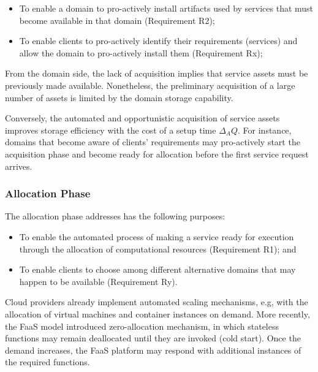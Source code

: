 \begin{itemize}

	\item To enable a domain to pro-actively install artifacts used by services that must become available in that domain (Requirement R2);
	
	\item To enable clients to pro-actively identify their requirements (services) and allow the domain to pro-actively install them (Requirement Rx);

\end{itemize}

From the domain side, the lack of acquisition implies that service assets must be previously made available. Nonetheless, the preliminary acquisition of a large number of assets is limited by the domain storage capability. 

Conversely, the automated and opportunistic acquisition of service assets improves storage efficiency with the cost of a setup time $\Delta_AQ$. For instance, domains that become aware of clients' requirements may pro-actively start the acquisition phase and become ready for allocation before the first service request arrives.


\subsubsection{Allocation Phase}\label{sec:A3-E-allocation}

The allocation phase addresses has the following purposes:

\begin{itemize}

\item To enable the automated process of making a service ready for execution through the allocation of computational resources (Requirement R1); and

\item To enable clients to choose among different alternative domains that may happen to be available (Requirement Ry).

\end{itemize}
 
Cloud providers already implement automated scaling mechanisms, e.g, with the allocation of virtual machines and container instances on demand. More recently, the FaaS model introduced zero-allocation mechanism, in which stateless functions may remain deallocated until they are invoked (cold start). Once the demand increases, the FaaS platform may respond with additional instances of the required functions.

